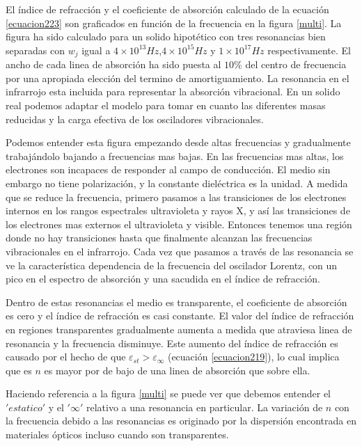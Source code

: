 \documentclass[a4paper,openright,12pt]{book}
\begin{document}
El índice de refracción y el coeficiente de absorción calculado de la ecuación \ref{ecuacion223} son graficados en función de la frecuencia en la figura \ref{multi}. La figura ha sido calculado para un solido hipotético con tres resonancias bien separadas con $w_{j}$ igual a $4\times 10^{13}Hz$,$4\times 10^{15}Hz$ y $1\times 10^{17}Hz$ respectivamente. El ancho de cada linea de absorción ha sido puesta al $10\%$ del centro de frecuencia por una apropiada elección del termino de amortiguamiento. La resonancia en el infrarrojo esta incluida para representar la absorción vibracional. En un solido real podemos adaptar el modelo para tomar en cuanto las diferentes masas reducidas y la carga efectiva de los osciladores vibracionales.

Podemos entender esta figura empezando desde altas frecuencias y gradualmente trabajándolo bajando a frecuencias mas bajas. En las frecuencias mas altas, los electrones son incapaces de responder al campo de conducción. El medio sin embargo no tiene polarización, y la constante dieléctrica es la unidad. A medida que se reduce la frecuencia, primero pasamos a las transiciones de los electrones internos en los rangos espectrales ultravioleta y rayos X, y así las transiciones de los electrones mas externos el ultravioleta y visible. Entonces tenemos una región donde no hay transiciones hasta que finalmente alcanzan las frecuencias vibracionales en el infrarrojo. Cada vez que pasamos a través de las resonancia se ve la característica dependencia de la frecuencia del oscilador Lorentz, con un pico en el espectro de absorción y una sacudida en el índice de refracción.

Dentro de estas resonancias el medio es transparente, el coeficiente de absorción es cero y el índice de refracción es casi constante.
El valor del índice de refracción en regiones transparentes gradualmente aumenta a medida que atraviesa linea de resonancia y la frecuencia disminuye. Este aumento del índice de refracción es causado por el hecho de que $\varepsilon_{st}>\varepsilon_{\infty}$ (ecuación \ref{ecuacion219}), lo cual implica que es $n$ es mayor por de bajo de una linea de absorción que sobre ella. 

Haciendo referencia a la figura \ref{multi} se puede ver que debemos entender el $'estatico'$ y el $'\infty ' $ relativo a una resonancia en particular. La variación de $n$ con la frecuencia debido a las resonancias es originado por la dispersión  encontrada en materiales ópticos incluso cuando son transparentes. 
\end{document}
